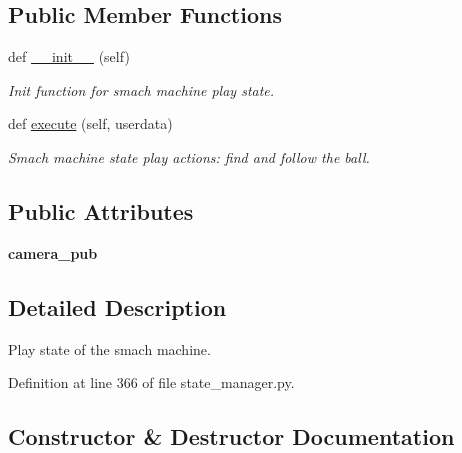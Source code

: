 \subsection*{Public Member Functions}
\begin{DoxyCompactItemize}
\item 
def \hyperlink{classstate__manager_1_1MIRO__Play_a863ae1958460cf6bf33faaba597fc5a2}{\+\_\+\+\_\+init\+\_\+\+\_\+} (self)
\begin{DoxyCompactList}\small\item\em Init function for smach machine play state. \end{DoxyCompactList}\item 
def \hyperlink{classstate__manager_1_1MIRO__Play_a781db4be4fcbb313c46097a8fdf06275}{execute} (self, userdata)
\begin{DoxyCompactList}\small\item\em Smach machine state play actions\+: find and follow the ball. \end{DoxyCompactList}\end{DoxyCompactItemize}
\subsection*{Public Attributes}
\begin{DoxyCompactItemize}
\item 
{\bfseries camera\+\_\+pub}\hypertarget{classstate__manager_1_1MIRO__Play_a72c307cf462ab1c9e0844c84df600078}{}\label{classstate__manager_1_1MIRO__Play_a72c307cf462ab1c9e0844c84df600078}

\end{DoxyCompactItemize}


\subsection{Detailed Description}
Play state of the smach machine. 



Definition at line 366 of file state\+\_\+manager.\+py.



\subsection{Constructor \& Destructor Documentation}
